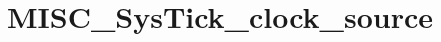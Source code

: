 \hypertarget{group___m_i_s_c___sys_tick__clock__source}{\section{M\-I\-S\-C\-\_\-\-Sys\-Tick\-\_\-clock\-\_\-source}
\label{group___m_i_s_c___sys_tick__clock__source}
}
